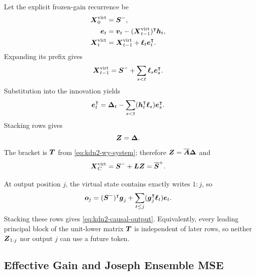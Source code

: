 \documentclass[11pt,letterpaper,logo]{yalearxiv}
\newcommand{\tril}{\operatorname{tril}}
\begin{document}
Let the explicit frozen-gain recurrence be
\begin{equation}
\begin{aligned}
  \boldsymbol{X}_0^{\mathrm{virt}}
  &=
  \boldsymbol{S}^-,
  \\
  \boldsymbol{e}_t
  &=
  \boldsymbol{v}_t
  -
  (\boldsymbol{X}_{t-1}^{\mathrm{virt}})^{\intercal}\boldsymbol{h}_t,
  \\
  \boldsymbol{X}_t^{\mathrm{virt}}
  &=
  \boldsymbol{X}_{t-1}^{\mathrm{virt}}
  +
  \boldsymbol{\ell}_t\boldsymbol{e}_t^{\intercal}.
\end{aligned}
\label{eq:app-kdn2-virtual-recurrence}
\end{equation}
Expanding its prefix gives
\begin{equation}
  \boldsymbol{X}_{t-1}^{\mathrm{virt}}
  =
  \boldsymbol{S}^-
  +
  \sum_{s<t}\boldsymbol{\ell}_s\boldsymbol{e}_s^{\intercal}.
  \label{eq:app-kdn2-virtual-expanded}
\end{equation}
Substitution into the innovation yields
\begin{equation}
  \boldsymbol{e}_t^{\intercal}
  =
  \boldsymbol{\Delta}_t
  -
  \sum_{s<t}
  (\boldsymbol{h}_t^{\intercal}\boldsymbol{\ell}_s)\boldsymbol{e}_s^{\intercal}.
  \label{eq:app-kdn2-residual-row}
\end{equation}
Stacking rows gives
\begin{equation}
  [\ve{I}+\tril(\ve{H}^{\tr}\ve{L},-1)]\ve{Z}
  =
  \ve{\Delta}.
  \label{eq:app-kdn2-stacked-system}
\end{equation}
The bracket is $\boldsymbol{T}$ from \eqref{eq:kdn2-wy-system}; therefore
$\boldsymbol{Z}=\overline{\boldsymbol{A}}\boldsymbol{\Delta}$ and
\begin{equation}
  \boldsymbol{X}_{C}^{\mathrm{virt}}
  =
  \boldsymbol{S}^-+\boldsymbol{L}\boldsymbol{Z}
  =
  \overline{\boldsymbol{S}}^+.
  \label{eq:app-kdn2-commit}
\end{equation}

At output position $j$, the virtual state contains exactly writes $1{:}j$, so
\begin{equation}
  \boldsymbol{o}_j
  =
  (\boldsymbol{S}^-)^{\intercal}\boldsymbol{g}_j
  +
  \sum_{t\leq j}
  (\boldsymbol{g}_j^{\intercal}\boldsymbol{\ell}_t)\boldsymbol{e}_t.
  \label{eq:app-kdn2-output}
\end{equation}
Stacking these rows gives \eqref{eq:kdn2-causal-output}. Equivalently, every leading principal
block of the unit-lower matrix $\boldsymbol{T}$ is independent of later rows, so neither $\boldsymbol{Z}_{1:j}$
nor output $j$ can use a future token.

\subsection{Effective Gain and Joseph Ensemble MSE}
\label{app:kdn2-joseph-proof}
\end{document}
